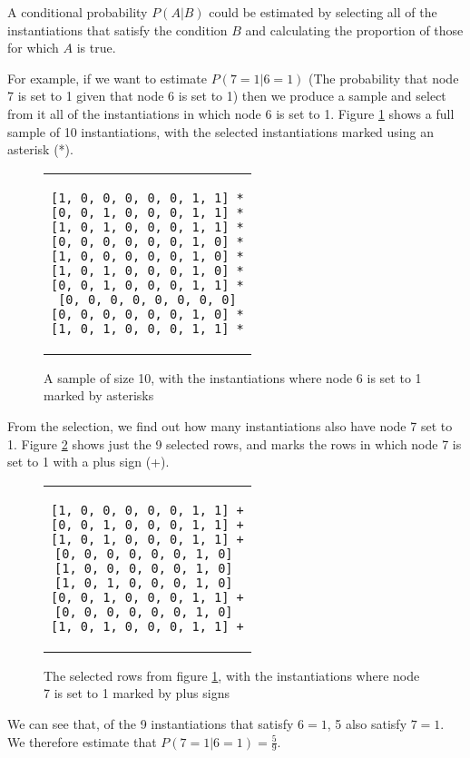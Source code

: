 \documentclass[a4paper,11pt]{article}
\begin{document}
A conditional probability $P(A|B)$ could be estimated by selecting all of the instantiations that satisfy the condition $B$ and calculating the proportion of those for which $A$ is true.

For example, if we want to estimate $P(7=1|6=1)$ (The probability that node 7 is set to 1 given that node 6 is set to 1) then we produce a sample and select from it all of the instantiations in which node 6 is set to 1.  Figure \ref{sample1} shows a full sample of 10 instantiations, with the selected instantiations marked using an asterisk (*).

\begin{figure}[h]
	\centering
	\lstset{basicstyle=\ttfamily}
	\begin{tabular}{c}
	\begin{lstlisting}
[1, 0, 0, 0, 0, 0, 1, 1] *
[0, 0, 1, 0, 0, 0, 1, 1] *
[1, 0, 1, 0, 0, 0, 1, 1] *
[0, 0, 0, 0, 0, 0, 1, 0] *
[1, 0, 0, 0, 0, 0, 1, 0] *
[1, 0, 1, 0, 0, 0, 1, 0] *
[0, 0, 1, 0, 0, 0, 1, 1] *
[0, 0, 0, 0, 0, 0, 0, 0]
[0, 0, 0, 0, 0, 0, 1, 0] *
[1, 0, 1, 0, 0, 0, 1, 1] *
	\end{lstlisting}
	\end{tabular}
	\caption{A sample of size 10, with the instantiations where node 6 is set to 1 marked by asterisks}
	\label{sample1}
\end{figure}

From the selection, we find out how many instantiations also have node 7 set to 1. Figure \ref{sample2} shows just the 9 selected rows, and marks the rows in which node 7 is set to 1 with a plus sign (+).

\begin{figure}[h]
	\centering
	\lstset{basicstyle=\ttfamily}
	\begin{tabular}{c}
	\begin{lstlisting}
[1, 0, 0, 0, 0, 0, 1, 1] +
[0, 0, 1, 0, 0, 0, 1, 1] +
[1, 0, 1, 0, 0, 0, 1, 1] +
[0, 0, 0, 0, 0, 0, 1, 0] 
[1, 0, 0, 0, 0, 0, 1, 0] 
[1, 0, 1, 0, 0, 0, 1, 0] 
[0, 0, 1, 0, 0, 0, 1, 1] +
[0, 0, 0, 0, 0, 0, 1, 0] 
[1, 0, 1, 0, 0, 0, 1, 1] +
	\end{lstlisting}
	\end{tabular}
	\caption{The selected rows from figure \ref{sample1}, with the instantiations where node 7 is set to 1 marked by plus signs}
	\label{sample2}
\end{figure}

We can see that, of the 9 instantiations that satisfy $6=1$, 5 also satisfy $7=1$.  We therefore estimate that $P(7=1|6=1) = \frac{5}{9}$.
\end{document}
